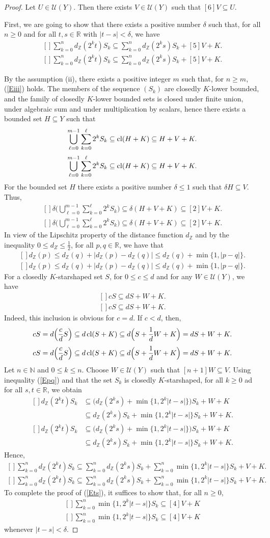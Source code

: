 \documentclass[12pt,reqno]{amsart}
\newcommand{\R}{\mathbb{R}}
\newcommand{\N}{\mathbb{N}}
\newcommand{\Z}{\mathbb{Z}}
\newcommand{\U}{\mathscr{U}}
\newcommand{\cl}{\mathop{\hbox{\rm cl}}\nolimits}
\theoremstyle{definition}
\def\eq#1{{\rm(\ref{E#1})}}
\def\Eq#1#2{\ifthenelse{\equal{#1}{*}}
  {\begin{equation*}\begin{aligned}[]#2\end{aligned}\end{equation*}}
  {\begin{equation}\begin{aligned}[]\label{E#1}#2\end{aligned}\end{equation}}}
\begin{document}
\begin{proof}
Let $U\in\U(Y)$. Then there exists $V\in\U(Y)$ such that $[6]V\subseteq U$. 

First, we are going to show that there exists a positive number $\delta$ such that,
for all $n\geq0$ and for all $t,s\in\R$ with $|t-s|<\delta$, we have
\Eq{ts}{
\sum_{k=0}^n d_\Z(2^kt)S_k \subseteq \sum_{k=0}^n d_\Z(2^ks)S_k + [5]V + K.
}

By the assumption (ii), there exists a positive integer $m$ such that, for $n\geq m$, \eq{iii} holds.
The members of the sequence $(S_k)$ are closedly $K$-lower bounded, and the family of closedly $K$-lower
bounded sets is closed under finite union, under algebraic sum and under multiplication by scalars, hence there exists 
a bounded set $H\subseteq Y$ such that 
\Eq{*}{
  \bigcup_{\ell=0}^{m-1}\sum_{k=0}^{\ell} 2^kS_k \subseteq \cl(H+K)\subseteq H+V+K.
} 
For the bounded set $H$ there exists a positive number $\delta\leq 1$ such that $\delta H\subseteq V$.
Thus,
\Eq{dd}{
  \delta\bigg(\bigcup_{\ell=0}^{m-1}\sum_{k=0}^{\ell} 2^kS_k\bigg) \subseteq \delta(H+V+K) \subseteq [2]V+K.
}
In view of the Lipschitz property of the distance function $d_\Z$ and by the inequality $0\leq d_Z\leq \frac12$, 
for all $p,q\in\R$, we have that
\Eq{pq}{
  d_\Z(p) \leq d_\Z(q)+|d_\Z(p)-d_\Z(q)| \leq d_\Z(q) +\min\big\{1,|p-q|\big\}.
}
For a closedly $K$-starshaped set $S$, for $0\leq c\leq d$ and for any $W\in\U(Y)$, we have
\Eq{*}{
  cS\subseteq dS+W+K.
}
Indeed, this inclusion is obvious for $c=d$. If $c<d$, then, 
\Eq{*}{
  cS=d\Big(\frac{c}{d}S\Big)\subseteq d\cl(S+K) \subseteq d\Big(S+\frac1d W+K\Big)=dS+W+K.
}
Let $n\in\N$ and $0\leq k\leq n$. Choose $W\in\U(Y)$ such that $[n+1]W\subseteq V$. 
Using inequality \eq{pq} and that the set $S_k$ is closedly $K$-starshaped, for all $k\geq0$ ad for all 
$s,t\in\R$, we obtain
\Eq{*}{
 d_\Z(2^kt)S_k &\subseteq \big(d_\Z(2^ks) +\min\big\{1,2^k|t-s|\}\big)S_k + W+K \\
               &\subseteq d_\Z(2^ks)S_k +\min\big\{1,2^k|t-s|\big\}S_k +W+K.
}
Hence, 
\Eq{split}{
  \sum_{k=0}^n d_\Z(2^kt)S_k  
     \subseteq \sum_{k=0}^n d_\Z(2^ks)S_k  + \sum_{k=0}^n\min\big\{1,2^k|t-s|\big\}S_k + V+K.
}
To complete the proof of \eq{ts}, it suffices to show that, for all $n\geq0$,
\Eq{fs}{
  \sum_{k=0}^n\min\big\{1,2^k|t-s|\big\}S_k\subseteq [4]V+K
}
whenever $|t-s|<\delta$. 


\end{proof}
\end{document}
